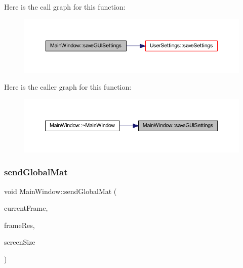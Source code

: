 Here is the call graph for this function\+:
\nopagebreak
\begin{figure}[H]
\begin{center}
\leavevmode
\includegraphics[width=350pt]{classMainWindow_a0806c678c7280ab0a786526522f91418_cgraph}
\end{center}
\end{figure}
Here is the caller graph for this function\+:
\nopagebreak
\begin{figure}[H]
\begin{center}
\leavevmode
\includegraphics[width=350pt]{classMainWindow_a0806c678c7280ab0a786526522f91418_icgraph}
\end{center}
\end{figure}
\mbox{\label{classMainWindow_a302481f26ce2f1666e4a4dfaddacb08e}} 
\subsubsection{\texorpdfstring{sendGlobalMat}{sendGlobalMat}}
{\footnotesize\ttfamily void Main\+Window\+::send\+Global\+Mat (\begin{DoxyParamCaption}\item[{Mat}]{current\+Frame,  }\item[{Q\+Size}]{frame\+Res,  }\item[{Q\+Rect}]{screen\+Size }\end{DoxyParamCaption})\hspace{0.3cm}{\ttfamily [signal]}}

